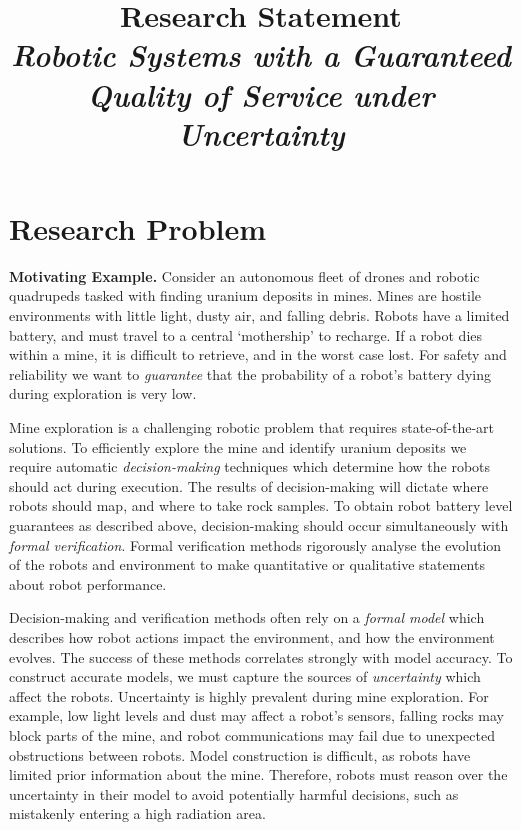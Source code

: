 \documentclass[12pt]{article}
\title{Research Statement\\ \large \emph{Robotic Systems with a Guaranteed Quality of Service under Uncertainty}}
\date{}
\author{}
\begin{document}
\maketitle
\thispagestyle{empty}

\section*{Research Problem}

\vspace*{1ex}\noindent\textbf{Motivating Example.} Consider an autonomous fleet of drones and robotic quadrupeds tasked with finding uranium deposits in mines.
%
Mines are hostile environments with little light, dusty air, and falling debris. 
%
Robots have a limited battery, and must travel to a central `mothership' to recharge.
%
If a robot dies within a mine, it is difficult to retrieve, and in the worst case lost.
%
For safety and reliability we want to \emph{guarantee} that the probability of a robot's battery dying during exploration is very low.

Mine exploration is a challenging robotic problem that requires state-of-the-art solutions.
%
To efficiently explore the mine and identify uranium deposits we require automatic \emph{decision-making} techniques which determine how the robots should act during execution.
%
The results of decision-making will dictate where robots should map, and where to take rock samples.
%
To obtain robot battery level guarantees as described above, decision-making should occur simultaneously with \emph{formal verification}.
%
Formal verification methods rigorously analyse the evolution of the robots and environment to make quantitative or qualitative statements about robot performance.

Decision-making and verification methods often rely on a \emph{formal model} which describes how robot actions impact the environment, and how the environment evolves.
%
The success of these methods correlates strongly with model accuracy.
%
To construct accurate models, we must capture the sources of \emph{uncertainty} which affect the robots.
%
Uncertainty is highly prevalent during mine exploration.
%
For example, low light levels and dust may affect a robot's sensors, falling rocks may block parts of the mine, and robot communications may fail due to unexpected obstructions between robots.
%
Model construction is difficult, as robots have limited prior information about the mine.
%
Therefore, robots must reason over the uncertainty in their model to avoid potentially harmful decisions, such as mistakenly entering a high radiation area.
\end{document}
